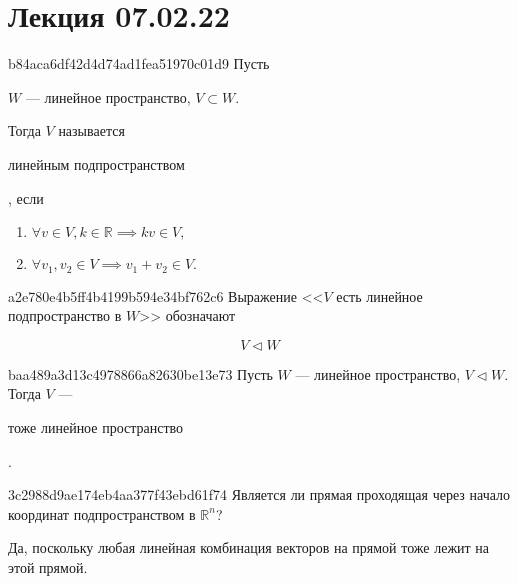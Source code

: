 


\section{Лекция 07.02.22}
\begin{note}{b84aca6df42d4d74ad1fea51970c01d9}
    Пусть \begin{icloze}{3}\( W \) --- линейное пространство, \( V \subset W. \) \end{icloze} Тогда \( V \) называется \begin{icloze}{2}линейным подпространством\end{icloze}, если
    \begin{icloze}{1}
        \begin{enumerate}
            \item \( \forall v \in V, k \in \mathbb R \implies kv \in V,  \)
            \item \( \forall v_1, v_2 \in V \implies v_1 + v_2 \in V. \)
        \end{enumerate}
    \end{icloze}
\end{note}

\begin{note}{a2e780e4b5ff4b4199b594e34bf762c6}
    Выражение <<\( V \) есть линейное подпространство в \( W \)>> обозначают
    \begin{icloze}{1}
        \[
            V \triangleleft W
        \]
    \end{icloze}
\end{note}

\begin{note}{baa489a3d13c4978866a82630be13e73}
    Пусть \( W \) --- линейное пространство, \( V \triangleleft W \). Тогда \( V \) --- \begin{icloze}{1}тоже линейное пространство\end{icloze}.
\end{note}

\begin{note}{3c2988d9ae174eb4aa377f43ebd61f74}
    Является ли прямая проходящая через начало координат подпространством в \( \mathbb R ^{n}  \)?

    \begin{cloze}{1}
        Да, поскольку любая линейная комбинация векторов на прямой тоже лежит на этой прямой.
    \end{cloze}
\end{note}

